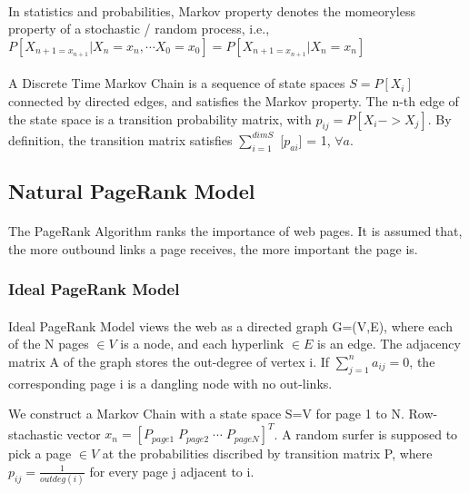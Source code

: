 \documentclass[a0,portrait]{a0poster}
\begin{document}
\begin{multicols}{2}
        \paragraph{}
        In statistics and probabilities, Markov property denotes the momeoryless property of a stochastic / random process, i.e.,
        $P[X_{n+1=x_{n+1}}\vert X_n=x_n,\cdots X_0=x_0]=P[X_{n+1=x_{n+1}}\vert X_n=x_n]$
        
        \paragraph{}
        A Discrete Time Markov Chain is a sequence of state spaces $S={P[X_i]}$ connected by directed edges, and satisfies the Markov property.
        The n-th edge of the state space is a transition probability matrix, with $p_{ij}=P[X_i->X_j]$.
        By definition, the transition matrix satisfies $\sum_{i=1}^{dim S}$ [$p_{ai}$] = 1, $\forall a$.
      \subsection*{Natural PageRank Model}
      \paragraph{}
        The PageRank Algorithm ranks the importance of web pages. It is assumed that, the more outbound links a page receives, the more important the page is.
        \subsubsection*{Ideal PageRank Model}
        \paragraph{}
        Ideal PageRank Model views the web as a directed graph G=(V,E), where each of the N pages $\in V$ is a node, and each hyperlink $\in E$ is an edge.
        The adjacency matrix A of the graph stores the out-degree of vertex i. If $\sum^n_{j=1}a_{ij}=0$, the corresponding page i is a dangling node with no out-links.
        
        We construct a Markov Chain with a state space S=V for page 1 to N. Row-stachastic vector $x_n=\left[P_{page1}\;P_{page2}\;\cdots\;P_{pageN}\right]^T$.
        A random surfer is supposed to pick a page $\in V$ at the probabilities discribed by 
        transition matrix P, where $p_{ij}=\frac{1}{outdeg(i)}$ for every page j adjacent to i.
        

\end{multicols}
\end{document}
